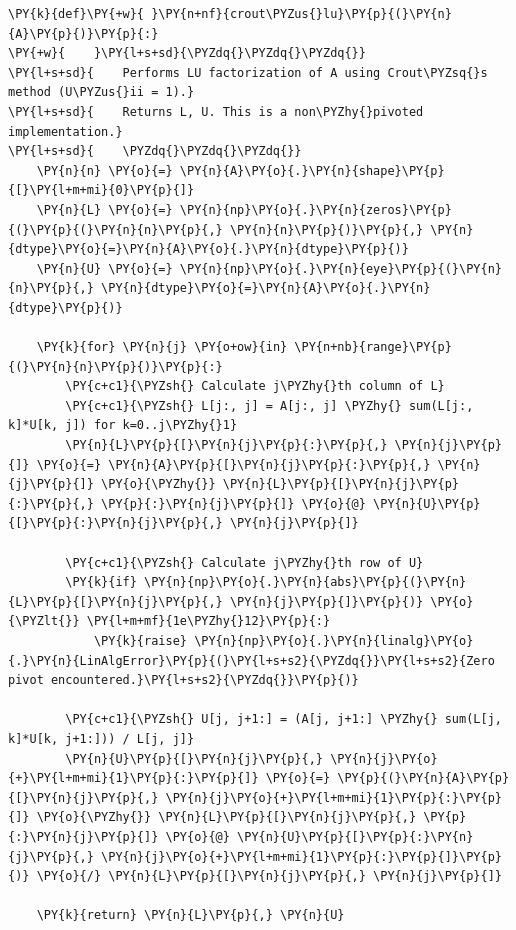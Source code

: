 \begin{Verbatim}[commandchars=\\\{\}]
\PY{k}{def}\PY{+w}{ }\PY{n+nf}{crout\PYZus{}lu}\PY{p}{(}\PY{n}{A}\PY{p}{)}\PY{p}{:}
\PY{+w}{    }\PY{l+s+sd}{\PYZdq{}\PYZdq{}\PYZdq{}}
\PY{l+s+sd}{    Performs LU factorization of A using Crout\PYZsq{}s method (U\PYZus{}ii = 1).}
\PY{l+s+sd}{    Returns L, U. This is a non\PYZhy{}pivoted implementation.}
\PY{l+s+sd}{    \PYZdq{}\PYZdq{}\PYZdq{}}
    \PY{n}{n} \PY{o}{=} \PY{n}{A}\PY{o}{.}\PY{n}{shape}\PY{p}{[}\PY{l+m+mi}{0}\PY{p}{]}
    \PY{n}{L} \PY{o}{=} \PY{n}{np}\PY{o}{.}\PY{n}{zeros}\PY{p}{(}\PY{p}{(}\PY{n}{n}\PY{p}{,} \PY{n}{n}\PY{p}{)}\PY{p}{,} \PY{n}{dtype}\PY{o}{=}\PY{n}{A}\PY{o}{.}\PY{n}{dtype}\PY{p}{)}
    \PY{n}{U} \PY{o}{=} \PY{n}{np}\PY{o}{.}\PY{n}{eye}\PY{p}{(}\PY{n}{n}\PY{p}{,} \PY{n}{dtype}\PY{o}{=}\PY{n}{A}\PY{o}{.}\PY{n}{dtype}\PY{p}{)}

    \PY{k}{for} \PY{n}{j} \PY{o+ow}{in} \PY{n+nb}{range}\PY{p}{(}\PY{n}{n}\PY{p}{)}\PY{p}{:}
        \PY{c+c1}{\PYZsh{} Calculate j\PYZhy{}th column of L}
        \PY{c+c1}{\PYZsh{} L[j:, j] = A[j:, j] \PYZhy{} sum(L[j:, k]*U[k, j]) for k=0..j\PYZhy{}1}
        \PY{n}{L}\PY{p}{[}\PY{n}{j}\PY{p}{:}\PY{p}{,} \PY{n}{j}\PY{p}{]} \PY{o}{=} \PY{n}{A}\PY{p}{[}\PY{n}{j}\PY{p}{:}\PY{p}{,} \PY{n}{j}\PY{p}{]} \PY{o}{\PYZhy{}} \PY{n}{L}\PY{p}{[}\PY{n}{j}\PY{p}{:}\PY{p}{,} \PY{p}{:}\PY{n}{j}\PY{p}{]} \PY{o}{@} \PY{n}{U}\PY{p}{[}\PY{p}{:}\PY{n}{j}\PY{p}{,} \PY{n}{j}\PY{p}{]}

        \PY{c+c1}{\PYZsh{} Calculate j\PYZhy{}th row of U}
        \PY{k}{if} \PY{n}{np}\PY{o}{.}\PY{n}{abs}\PY{p}{(}\PY{n}{L}\PY{p}{[}\PY{n}{j}\PY{p}{,} \PY{n}{j}\PY{p}{]}\PY{p}{)} \PY{o}{\PYZlt{}} \PY{l+m+mf}{1e\PYZhy{}12}\PY{p}{:}
            \PY{k}{raise} \PY{n}{np}\PY{o}{.}\PY{n}{linalg}\PY{o}{.}\PY{n}{LinAlgError}\PY{p}{(}\PY{l+s+s2}{\PYZdq{}}\PY{l+s+s2}{Zero pivot encountered.}\PY{l+s+s2}{\PYZdq{}}\PY{p}{)}

        \PY{c+c1}{\PYZsh{} U[j, j+1:] = (A[j, j+1:] \PYZhy{} sum(L[j, k]*U[k, j+1:])) / L[j, j]}
        \PY{n}{U}\PY{p}{[}\PY{n}{j}\PY{p}{,} \PY{n}{j}\PY{o}{+}\PY{l+m+mi}{1}\PY{p}{:}\PY{p}{]} \PY{o}{=} \PY{p}{(}\PY{n}{A}\PY{p}{[}\PY{n}{j}\PY{p}{,} \PY{n}{j}\PY{o}{+}\PY{l+m+mi}{1}\PY{p}{:}\PY{p}{]} \PY{o}{\PYZhy{}} \PY{n}{L}\PY{p}{[}\PY{n}{j}\PY{p}{,} \PY{p}{:}\PY{n}{j}\PY{p}{]} \PY{o}{@} \PY{n}{U}\PY{p}{[}\PY{p}{:}\PY{n}{j}\PY{p}{,} \PY{n}{j}\PY{o}{+}\PY{l+m+mi}{1}\PY{p}{:}\PY{p}{]}\PY{p}{)} \PY{o}{/} \PY{n}{L}\PY{p}{[}\PY{n}{j}\PY{p}{,} \PY{n}{j}\PY{p}{]}

    \PY{k}{return} \PY{n}{L}\PY{p}{,} \PY{n}{U}
\end{Verbatim}

